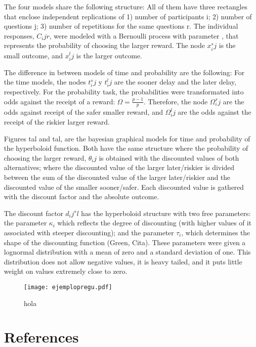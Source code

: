 \documentclass[jou,apacite]{apa6}
\begin{document}
The four models share the following structure: All of them have three rectangles that enclose independent replications of 1) number of participants i; 2) number of questions j; 3) number of repetitions for the same questions r. The individual responses, $C_ijr$, were modeled with a Bernoulli process with parameter , that represents the probability of choosing the larger reward. The node $x^s_ij$ is the small outcome, and $x^l_ij$ is the larger outcome. 

The difference in between models of time and probability are the following: For the time models, the nodes $t^s_ij$ y $t^l_ij$ are the sooner delay and the later delay, respectively. For the probability task, the probabilities were transformated into odds against the receipt of a reward: $\Omega = \frac{p-1}{p}$. Therefore, the node $\Omega^s_ij$ are the odds against receipt of the safer smaller reward, and $\Omega^l_ij$ are the odds against the receipt of the riskier larger reward. 

Figures tal and tal, are the bayesian graphical models for time and probability of the hyperboloid function. Both have the same structure where the probability of choosing the larger reward, $\theta_ij$ is obtained with the discounted values of both alternatives; where the discounted value of the larger later/riskier is divided between the sum of the discounted value of the larger later/riskier and the discounted value of the smaller sooner/safer. Each discounted value is gathered with the discount factor and the absolute outcome. 

The discount factor $d_ij^sl$ has the hyperboloid structure with two free parameters: the parameter $\kappa_i$ which reflects the degree of discounting (with higher values of it associated with steeper discounting); and the parameter $\tau_i$, which determines the shape of the discounting function (Green, Cita). These parameters were given a lognormal distribution with a mean of zero and a standard deviation of one. This distribution does not allow negative values, it is heavy tailed, and it puts little weight on values extremely close to zero. 

\begin{figure}[!ht]
\centering
\texttt{[image: ejemplopregu.pdf]}
\caption{hola}
\label{fig:hiperpro}
\end{figure}


\section{References}
\end{document}
